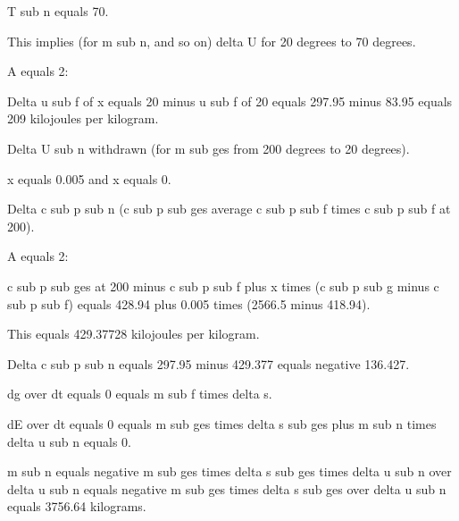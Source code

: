 T sub n equals 70.

This implies (for m sub n, and so on) delta U for 20 degrees to 70 degrees.

A equals 2:

Delta u sub f of x equals 20 minus u sub f of 20 equals 297.95 minus 83.95 equals 209 kilojoules per kilogram.

Delta U sub n withdrawn (for m sub ges from 200 degrees to 20 degrees).

x equals 0.005 and x equals 0.

Delta c sub p sub n (c sub p sub ges average c sub p sub f times c sub p sub f at 200).

A equals 2:

c sub p sub ges at 200 minus c sub p sub f plus x times (c sub p sub g minus c sub p sub f) equals 428.94 plus 0.005 times (2566.5 minus 418.94).

This equals 429.37728 kilojoules per kilogram.

Delta c sub p sub n equals 297.95 minus 429.377 equals negative 136.427.

dg over dt equals 0 equals m sub f times delta s.

dE over dt equals 0 equals m sub ges times delta s sub ges plus m sub n times delta u sub n equals 0.

m sub n equals negative m sub ges times delta s sub ges times delta u sub n over delta u sub n equals negative m sub ges times delta s sub ges over delta u sub n equals 3756.64 kilograms.